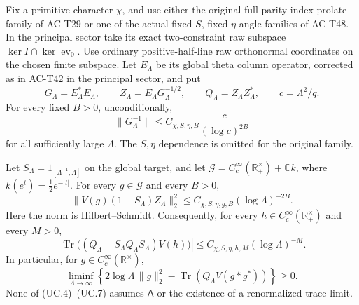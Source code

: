 \begin{theorem}
\label{AC-T50}
Fix a primitive character \(\chi\), and use either the
original full parity-index prolate family of AC-T29 or
one of the actual fixed-\(S\), fixed-\(\eta\) angle families
of AC-T48.  In the principal sector take its exact
two-constraint raw subspace
\(\ker I\cap\ker\operatorname{ev}_0\).
Use ordinary positive-half-line raw orthonormal coordinates
on the chosen finite subspace.
Let \(E_\Lambda\) be its global theta column operator,
corrected as in AC-T42 in the principal sector, and put
\[
       G_\Lambda=E_\Lambda^*E_\Lambda,\qquad
       Z_\Lambda=E_\Lambda G_\Lambda^{-1/2},\qquad
       Q_\Lambda=Z_\Lambda Z_\Lambda^*,\qquad
       c=\Lambda^2/q .
\]
For every fixed \(B>0\), unconditionally,
\[
 \|G_\Lambda^{-1}\|
       \leq C_{\chi,S,\eta,B}\frac{c}{(\log c)^{2B}}
 \tag{UC.4}
\]
for all sufficiently large \(\Lambda\).
The \(S,\eta\) dependence is omitted for the original family.

Let \(S_\Lambda=1_{[\Lambda^{-1},\Lambda]}\) on the
global target, and let
\(\mathscr G=C_c^\infty(\mathbb R_+^\times)+\mathbb C k\),
where \(k(e^t)=\frac12e^{-|t|}\).
For every \(g\in\mathscr G\) and every \(B>0\),
\[
 \|V(g)(1-S_\Lambda)Z_\Lambda\|_2^2
        \leq C_{\chi,S,\eta,g,B}(\log\Lambda)^{-2B}.
 \tag{UC.5}
\]
Here the norm is Hilbert--Schmidt.
Consequently, for every \(h\in C_c^\infty(\mathbb R_+^\times)\)
and every \(M>0\),
\[
 \left|\operatorname{Tr}
       \bigl((Q_\Lambda-S_\Lambda Q_\Lambda S_\Lambda)V(h)\bigr)
       \right|
       \leq C_{\chi,S,\eta,h,M}(\log\Lambda)^{-M}.
 \tag{UC.6}
\]
In particular, for \(g\in C_c^\infty(\mathbb R_+^\times)\),
\[
 \liminf_{\Lambda\to\infty}
 \left\{2\log\Lambda\,\|g\|_2^2
        -\operatorname{Tr}(Q_\Lambda V(g*g^*))\right\}\geq0 .
 \tag{UC.7}
\]
None of (UC.4)--(UC.7) assumes \(\mathsf A\) or the
existence of a renormalized trace limit.
\end{theorem}
